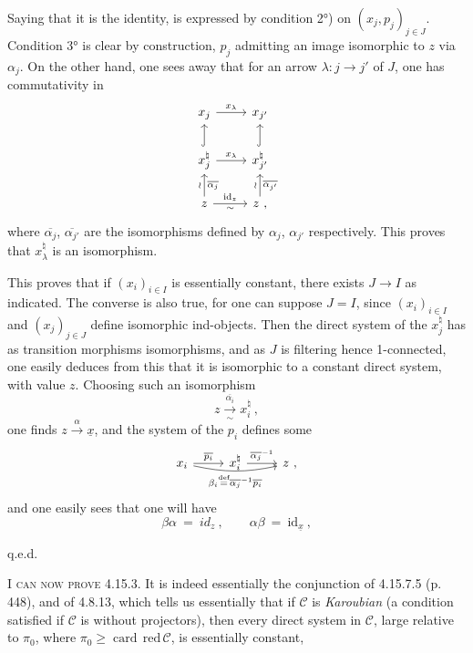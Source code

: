 \documentclass[11pt]{article}
\newcommand{\printedpage}[1]{\marginpar{\footnotesize p.~#1}}
\newcommand{\msp}[1]{\marginpar{\footnotesize [#1]}}
\newcommand{\card}{\operatorname{card}}
\begin{document}
\printedpage{174}

\msp{page 451}
Saying that it is the identity, is expressed by condition 2°) on $(x_j,p_j)_{j\in J}$. Condition 3° is clear by construction, $p_j$ admitting an image isomorphic to $z$ via $\alpha_j$. On the other hand, one sees away that for an arrow $\lambda : j \longrightarrow j'$ of $J$, one has commutativity in %
\[
\begin{tikzcd}
x_j \arrow[r, "x_\lambda"] & x_{j'} \\
x_j^\natural \arrow[u, hook] \arrow[r, "x_\lambda"] & x_{j'}^\natural \arrow[u, hook] \\
z \arrow[u, "\wr", "\overline{\alpha_j}"'] \arrow[r, "\mathrm{id}_z", "\sim"'] & z \ , \arrow[u, "\wr", "\overline{\alpha_{j'}}"']
\end{tikzcd}
\]
where $\overline{\alpha_j}$, $\overline{\alpha_{j'}}$ are the isomorphisms defined by $\alpha_j$, $\alpha_{j'}$ respectively. This proves that $x_\lambda^\natural$ is an isomorphism.

This proves that if $(x_i)_{i\in I}$ is essentially constant, there exists $J\longrightarrow I$ as indicated. The converse is also true, for one can suppose $J = I$, since $(x_i)_{i\in I}$ and $(x_j)_{j\in J}$ define isomorphic ind-objects. Then the direct system of the $x_j^\natural$ has as transition morphisms isomorphisms, and as $J$ is filtering hence 1-connected, one easily deduces from this that it is isomorphic
\msp{page 452}
to a constant direct system, with value $z$. Choosing such an isomorphism
\[
z \xrightarrow[\sim]{\overline{\alpha_i}} x_i^\natural \ ,
\]
one finds $z \xrightarrow{\alpha} \underline{x}$, and the system of the $p_i$ defines some
\[
\begin{tikzcd}
x_i \arrow[r, "\overline{p_i}"] \arrow[rr, bend right=12, "\beta_i \overset{\text{def}}{=} \overline{\alpha_j}^{-1}\overline{p_i}"'] & x_i^\natural \arrow[r, "\overline{\alpha_j}^{-1}"] & z \ ,
\end{tikzcd}
\] %
and one easily sees that one will have
\[
\beta\alpha \ = \ id_z \ , \qquad \alpha\beta \ = \ \mathrm{id}_{\underline{x}} \ ,
\]

\hfill q.e.d.

\textsc{I can now prove} 4.15.3. It is indeed essentially the conjunction of 4.15.7.5 (p. 448), and of 4.8.13, which tells us essentially that if $\mathcal{C}$ is \textit{Karoubian} (a condition satisfied if $\mathcal{C}$ is without projectors), then every direct system in $\mathcal{C}$, large relative to $\pi_0$, where $\pi_0 \geqslant \card\,\text{red}\,\mathcal{C}$, is essentially constant,
\end{document}
